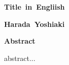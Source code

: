 \newpage
\thispagestyle{empty}
\begin{center}
\mbox{\LARGE{\bf{Title in Engliish}}}

\vspace*{2mm}
\mbox{\Large{\bf{Harada Yoshiaki}}}

\vspace*{7mm}
{\LARGE\bf Abstract}
\end{center}
abstract...